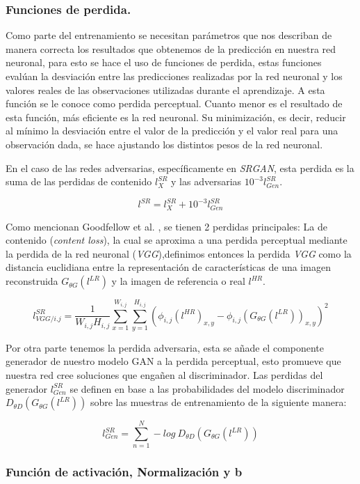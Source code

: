 \subsubsection{Funciones de perdida.}

Como parte del entrenamiento se necesitan parámetros que nos describan de manera correcta los resultados
que obtenemos de la predicción en nuestra red neuronal, para esto se hace el uso de funciones de perdida, estas funciones 
evalúan la desviación entre las predicciones realizadas por la red neuronal y los valores 
reales de las observaciones utilizadas durante el aprendizaje. A esta función se le conoce como perdida perceptual. Cuanto menor es el resultado de esta función, 
más eficiente es la red neuronal. Su minimización, es decir, reducir al mínimo la desviación entre el valor de la predicción y
el valor real para una observación dada, se hace ajustando los distintos pesos de la red neuronal.

En el caso de las redes adversarias, específicamente en \emph{SRGAN}, esta perdida es la suma de las perdidas de contenido $l_{X}^{SR}$ 
y las adversarias $10^{-3}l_{Gen}^{SR}$.


\begin{equation}
  l^{SR}=l_{X}^{SR} + 10^{-3}l_{Gen}^{SR}
\end{equation}


Como mencionan Goodfellow et al. \cite{GANs}, se tienen 
2 perdidas principales: La de contenido (\emph{content loss}), la cual se aproxima a una perdida perceptual mediante la perdida
de la red neuronal (\emph{VGG}),definimos entonces la perdida \emph{VGG} como la distancia euclidiana entre la representación de
características de una imagen reconstruida $G_{\theta G}(l^{LR})$ y la imagen de referencia o real $l^{HR}$.


\begin{equation}
  l_{VGG/i.j}^{SR}=\frac{1}{W_{i,j}H_{i,j}} \sum_{x=1}^{W_{i,j}}\sum_{y=1}^{H_{i,j}}(\phi_{i,j}(l^{HR})_{x,y}-\phi_{i,j} 
  (G_{\theta G}(l^{LR}))_{x,y})^{2}
\end{equation}

Por otra parte tenemos la perdida adversaria, esta se añade el componente generador de nuestro modelo GAN a la perdida perceptual,
esto promueve que nuestra red cree soluciones que engañen al discriminador. Las perdidas del generador $l_{Gen}^{SR}$ se definen
en base a las probabilidades del modelo discriminador $D_{\theta D}(G_{\theta G}(l^{LR}))$ sobre las muestras de entrenamiento
de la siguiente manera:

\begin{equation}
  l_{Gen}^{SR}=\sum_{n=1}^{N}-log \ D_{\theta D}(G_{\theta G}(l^{LR}))
\end{equation}

\subsubsection{Función de activación, Normalización y b}


